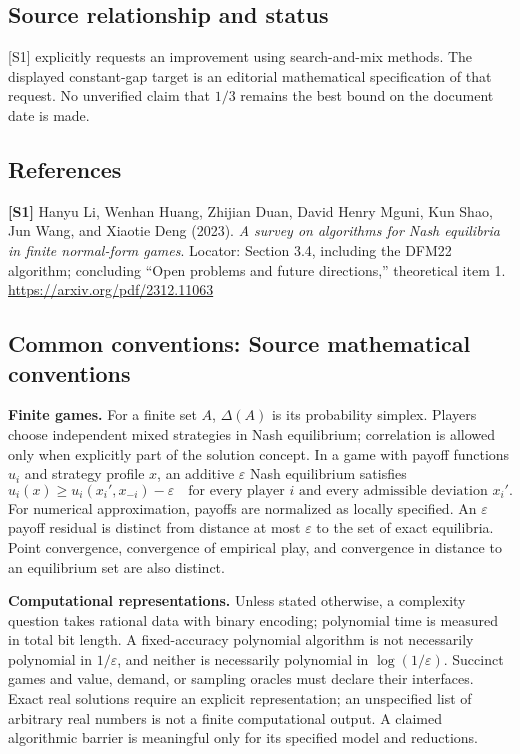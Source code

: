 \documentclass[11pt,a4paper]{article}
\begin{document}
\subsection*{Source relationship and status}
[S1] explicitly requests an improvement using search-and-mix methods. The displayed constant-gap target is an editorial mathematical specification of that request. No unverified claim that $1/3$ remains the best bound on the document date is made.
\subsection*{References}
\begingroup\footnotesize\raggedright
{\footnotesize\raggedright
\textbf{[S1]} Hanyu Li, Wenhan Huang, Zhijian Duan, David Henry Mguni, Kun Shao, Jun Wang, and Xiaotie Deng (2023). \emph{A survey on algorithms for Nash equilibria in finite normal-form games}. Locator: Section 3.4, including the DFM22 algorithm; concluding ``Open problems and future directions,'' theoretical item 1. \url{https://arxiv.org/pdf/2312.11063}\par}
\par\endgroup

\subsection*{Common conventions: Source mathematical conventions}

\textbf{Finite games.} For a finite set $A$, $\Delta(A)$ is its probability
simplex. Players choose independent mixed strategies in Nash equilibrium;
correlation is allowed only when explicitly part of the solution concept.
In a game with payoff functions $u_i$ and strategy profile $x$, an additive
$\varepsilon$ Nash equilibrium satisfies
\[
 u_i(x)\geq u_i(x_i',x_{-i})-\varepsilon
 \quad\text{for every player $i$ and every admissible deviation $x_i'$}.
\]
For numerical approximation, payoffs are normalized as locally specified.
An $\varepsilon$ payoff residual is distinct from distance at most
$\varepsilon$ to the set of exact equilibria. Point convergence, convergence
of empirical play, and convergence in distance to an equilibrium set are
also distinct.

\textbf{Computational representations.} Unless stated otherwise, a complexity
question takes rational data with binary encoding; polynomial time is measured
in total bit length. A fixed-accuracy polynomial algorithm is not necessarily
polynomial in $1/\varepsilon$, and neither is necessarily polynomial in
$\log(1/\varepsilon)$. Succinct games and value, demand, or sampling oracles
must declare their interfaces. Exact real solutions require an explicit
representation; an unspecified list of arbitrary real numbers is not a
finite computational output. A claimed algorithmic barrier is meaningful
only for its specified model and reductions.
\end{document}
